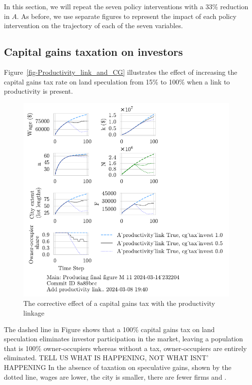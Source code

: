 In this section, we will repeat the seven policy interventions with a 33\% reduction in $A$.  As before, we use separate figures to represent the impact of each policy intervention on the trajectory of each of the seven variables. 


\newpage
\subsection{Capital gains taxation on investors}
Figure~\ref{fig-Productivity_link_and_CG} illustrates the effect of increasing the capital gains tax rate on land speculation from 15\% to 100\%  when a link to productivity is present.

\begin{figure}[h!tb]\label{fig-Productivity_link_and_CG}
    \centering
     \includegraphics[scale=1, trim=.25cm 2cm .25cm .25cm, clip]{fig/With-productivity_linkcg_tax_invest-232204.pdf}
    \caption{The corrective effect of a capital gains tax with the productivity linkage}
    \label{fig:Productivity_link_and_CG}
\end{figure}

The dashed line in Figure shows that a 100\% capital gains tax on land speculation eliminates investor participation in the market, leaving a population that is 100\%  owner-occupiers whereas without a tax, owner-occupiers are entirely eliminated.  {\color{red} TELL US WHAT IS HAPPENING, NOT WHAT ISNT' HAPPENING} In the absence of taxation on speculative gains, shown by the dotted line, wages are lower, the city is smaller, there are fewer firms and . 

